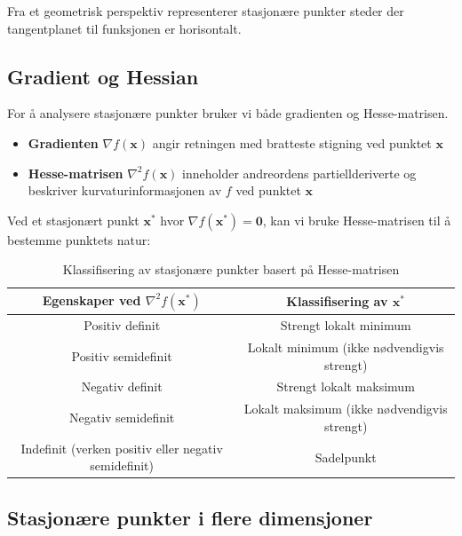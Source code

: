 Fra et geometrisk perspektiv representerer stasjonære punkter steder der tangentplanet til funksjonen er horisontalt.

\subsection{Gradient og Hessian}
\label{subsec:gradient_hessian}

For å analysere stasjonære punkter bruker vi både gradienten og Hesse-matrisen.

\begin{itemize}
	\item \textbf{Gradienten} \(\nabla f(\symbf{x})\) angir retningen med bratteste stigning ved punktet \(\symbf{x}\)
	\item \textbf{Hesse-matrisen} \(\nabla^2 f(\symbf{x})\) inneholder andreordens partiellderiverte og beskriver kurvaturinformasjonen av \(f\) ved punktet \(\symbf{x}\)
\end{itemize}

Ved et stasjonært punkt \(\symbf{x}^\ast\) hvor \(\nabla f(\symbf{x}^\ast) = \symbf{0}\), kan vi bruke Hesse-matrisen til å bestemme punktets natur:

\begin{table}[H]
	\centering
	\begin{tabular}{|c|c|}
		\hline
		\textbf{Egenskaper ved \(\nabla^2 f(\symbf{x}^\ast)\)} & \textbf{Klassifisering av \(\symbf{x}^\ast\)} \\
		\hline
		Positiv definit                                        & Strengt lokalt minimum                        \\
		\hline
		Positiv semidefinit                                    & Lokalt minimum (ikke nødvendigvis strengt)    \\
		\hline
		Negativ definit                                        & Strengt lokalt maksimum                       \\
		\hline
		Negativ semidefinit                                    & Lokalt maksimum (ikke nødvendigvis strengt)   \\
		\hline
		Indefinit (verken positiv eller negativ semidefinit)   & Sadelpunkt                                    \\
		\hline
	\end{tabular}
	\caption{Klassifisering av stasjonære punkter basert på Hesse-matrisen}
	\label{tab:stationary_classification}
\end{table}

\subsection{Stasjonære punkter i flere dimensjoner}
\label{subsec:stationary_multi_dim}

